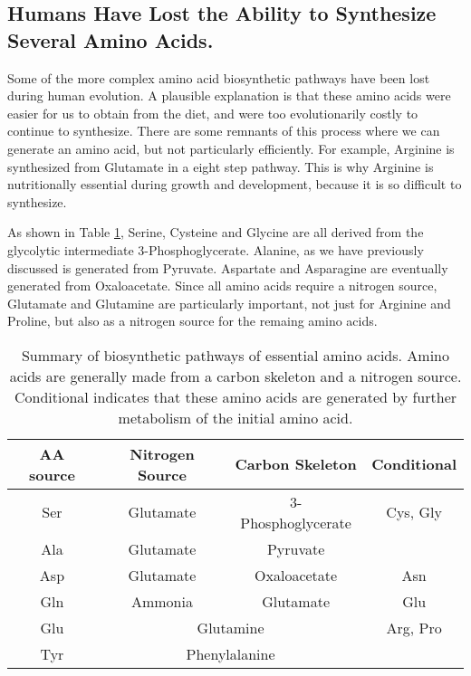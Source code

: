 \documentclass{tufte-handout}
\begin{document}
\subsection{Humans Have Lost the Ability to Synthesize Several Amino Acids.}  Some of the more complex amino acid biosynthetic pathways have been lost during human evolution.  A plausible explanation is that these amino acids were easier for us to obtain from the diet, and were too evolutionarily costly to continue to synthesize.  There are some remnants of this process where we can generate an amino acid, but not particularly efficiently.   For example, Arginine is synthesized from Glutamate in a eight step pathway.  This is why Arginine is nutritionally essential during growth and development, because it is so difficult to synthesize.

  As shown in Table \ref{tab:aa-biosynthesis-summary}, Serine, Cysteine and Glycine are all derived from the glycolytic intermediate 3-Phosphoglycerate.  Alanine, as we have previously discussed is generated from Pyruvate.  Aspartate and Asparagine are eventually generated from Oxaloacetate.  Since all amino acids require a nitrogen source, Glutamate and Glutamine are particularly important, not just for Arginine and Proline, but also as a nitrogen source for the remaing amino acids. 

\begin{table}[h]
\centering
\caption{Summary of biosynthetic pathways of essential amino acids.  Amino acids are generally made from a carbon skeleton and a nitrogen source.  Conditional indicates that these amino acids are generated by further metabolism of the initial amino acid.}
\label{tab:aa-biosynthesis-summary}
\begin{tabular}{|c|c|c|c|}
\hline
AA source        & Nitrogen Source  & Carbon Skeleton & Conditional      \\ \hline
Ser    & Glutamate                            & 3-Phosphoglycerate                                 & Cys, Gly            \\ \hline
Ala   & Glutamate                            & Pyruvate                             &                              \\ \hline
Asp & Glutamate                         & Oxaloacetate                        & Asn                   \\ \hline
Gln & Ammonia                              & Glutamate                            &   Glu                           \\ \hline
Glu & \multicolumn{2}{c|}{Glutamine}                                              & Arg, Pro \\ \hline
Tyr  & \multicolumn{2}{c|}{Phenylalanine}                                          &                              \\ \hline
\end{tabular}
\end{table}
\end{document}
